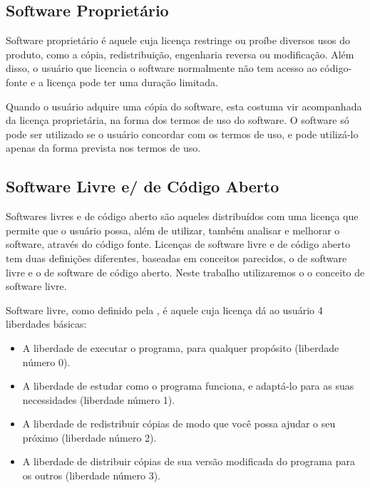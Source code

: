 \subsection{Software Proprietário} 

Software proprietário é aquele cuja licença restringe ou proíbe diversos usos do produto, como a cópia, redistribuição, engenharia reversa ou modificação. Além disso, o usuário que licencia o software normalmente não tem acesso ao código-fonte e a licença pode ter uma duração limitada.

Quando o usuário adquire uma cópia do software, esta costuma vir acompanhada da licença proprietária, na forma dos termos de uso do software. O software só pode ser utilizado se o usuário concordar com os termos de uso, e pode utilizá-lo apenas da forma prevista nos termos de uso.

\subsection{Software Livre e/ de Código Aberto}

Softwares livres e de código aberto são aqueles distribuídos com uma licença que permite que o usuário possa, além de utilizar, também analisar e melhorar o software, através do código fonte. Licenças de software livre e de código aberto tem duas definições diferentes, baseadas em conceitos parecidos, o de software livre e o de software de código aberto. Neste trabalho utilizaremos o o conceito de software livre.

Software livre, como definido pela , é aquele cuja licença dá ao usuário 4 liberdades básicas\cite{GNUFreeSoftware}:

\begin{itemize}

\item A liberdade de executar o programa, para qualquer propósito (liberdade número 0).
\item A liberdade de estudar como o programa funciona, e adaptá-lo para as suas necessidades (liberdade número 1).
\item A liberdade de redistribuir cópias de modo que você possa ajudar o seu próximo (liberdade número 2).
\item A liberdade de distribuir cópias de sua versão modificada do programa para os outros (liberdade número 3).

\end{itemize}

